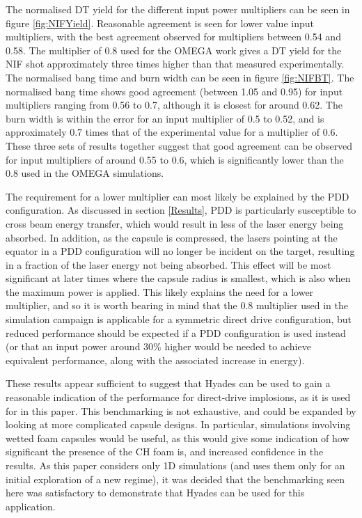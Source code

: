 The normalised DT yield for the different input power multipliers can be seen in figure \ref{fig:NIFYield}. Reasonable agreement is seen for lower value input multipliers, with the best agreement observed for multipliers between 0.54 and 0.58. The multiplier of 0.8 used for the OMEGA work gives a DT yield for the NIF shot approximately three times higher than that measured experimentally. The normalised bang time and burn width can be seen in figure \ref{fig:NIFBT}. The normalised bang time shows good agreement (between 1.05 and 0.95) for input multipliers ranging from 0.56 to 0.7, although it is closest for around 0.62. The burn width is within the error for an input multiplier of 0.5 to 0.52, and is approximately 0.7 times that of the experimental value for a multiplier of 0.6. These three sets of results together suggest that good agreement can be observed for input multipliers of around 0.55 to 0.6, which is significantly lower than the 0.8 used in the OMEGA simulations.

The requirement for a lower multiplier can most likely be explained by the PDD configuration. As discussed in section \ref{Results}, PDD is particularly susceptible to cross beam energy transfer, which would result in less of the laser energy being absorbed. In addition, as the capsule is compressed, the lasers pointing at the equator in a PDD configuration will no longer be incident on the target, resulting in a fraction of the laser energy not being absorbed. This effect will be most significant at later times where the capsule radius is smallest, which is also when the maximum power is applied. This likely explains the need for a lower multiplier, and so it is worth bearing in mind that the 0.8 multiplier used in the simulation campaign is applicable for a symmetric direct drive configuration, but reduced performance should be expected if a PDD configuration is used instead (or that an input power around 30\% higher would be needed to achieve equivalent performance, along with the associated increase in energy).

These results appear sufficient to suggest that Hyades can be used to gain a reasonable indication of the performance for direct-drive implosions, as it is used for in this paper. This benchmarking is not exhaustive, and could be expanded by looking at more complicated capsule designs. In particular, simulations involving wetted foam capsules would be useful, as this would give some indication of how significant the presence of the CH foam is, and increased confidence in the results. As this paper considers only 1D simulations (and uses them only for an initial exploration of a new regime), it was decided that the benchmarking seen here was satisfactory to demonstrate that Hyades can be used for this application.
